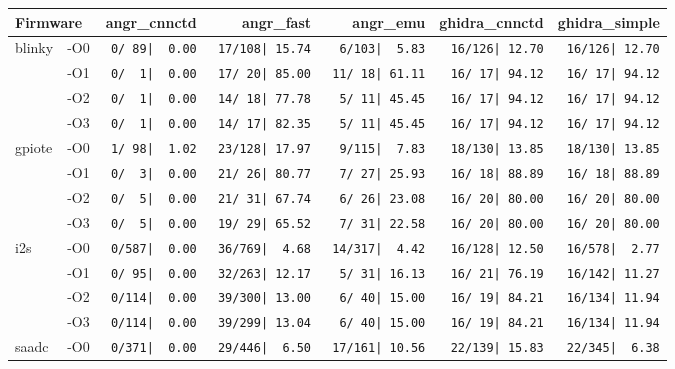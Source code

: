 \begin{tabular}{@{}llrrrrr@{}}
\toprule
\multicolumn{2}{l}{\textbf{Firmware}} & angr\_cnnctd & angr\_fast & angr\_emu & ghidra\_cnnctd & ghidra\_simple \\ \midrule
\multirow{4}{*}{blinky}
    & -O0 & \texttt{  0/~89|~~0.00} & \texttt{ 17/108|~15.74} & \texttt{  6/103|~~5.83} & \texttt{ 16/126|~12.70} & \texttt{ 16/126|~12.70} \\
    & -O1 & \texttt{  0/~~1|~~0.00} & \texttt{ 17/~20|~85.00} & \texttt{ 11/~18|~61.11} & \texttt{ 16/~17|~94.12} & \texttt{ 16/~17|~94.12} \\
    & -O2 & \texttt{  0/~~1|~~0.00} & \texttt{ 14/~18|~77.78} & \texttt{  5/~11|~45.45} & \texttt{ 16/~17|~94.12} & \texttt{ 16/~17|~94.12} \\
    & -O3 & \texttt{  0/~~1|~~0.00} & \texttt{ 14/~17|~82.35} & \texttt{  5/~11|~45.45} & \texttt{ 16/~17|~94.12} & \texttt{ 16/~17|~94.12} \\ \midrule
\multirow{4}{*}{gpiote}
    & -O0 & \texttt{  1/~98|~~1.02} & \texttt{ 23/128|~17.97} & \texttt{  9/115|~~7.83} & \texttt{ 18/130|~13.85} & \texttt{ 18/130|~13.85} \\
    & -O1 & \texttt{  0/~~3|~~0.00} & \texttt{ 21/~26|~80.77} & \texttt{  7/~27|~25.93} & \texttt{ 16/~18|~88.89} & \texttt{ 16/~18|~88.89} \\
    & -O2 & \texttt{  0/~~5|~~0.00} & \texttt{ 21/~31|~67.74} & \texttt{  6/~26|~23.08} & \texttt{ 16/~20|~80.00} & \texttt{ 16/~20|~80.00} \\
    & -O3 & \texttt{  0/~~5|~~0.00} & \texttt{ 19/~29|~65.52} & \texttt{  7/~31|~22.58} & \texttt{ 16/~20|~80.00} & \texttt{ 16/~20|~80.00} \\ \midrule
\multirow{4}{*}{i2s}
    & -O0 & \texttt{  0/587|~~0.00} & \texttt{ 36/769|~~4.68} & \texttt{ 14/317|~~4.42} & \texttt{ 16/128|~12.50} & \texttt{ 16/578|~~2.77} \\
    & -O1 & \texttt{  0/~95|~~0.00} & \texttt{ 32/263|~12.17} & \texttt{  5/~31|~16.13} & \texttt{ 16/~21|~76.19} & \texttt{ 16/142|~11.27} \\
    & -O2 & \texttt{  0/114|~~0.00} & \texttt{ 39/300|~13.00} & \texttt{  6/~40|~15.00} & \texttt{ 16/~19|~84.21} & \texttt{ 16/134|~11.94} \\
    & -O3 & \texttt{  0/114|~~0.00} & \texttt{ 39/299|~13.04} & \texttt{  6/~40|~15.00} & \texttt{ 16/~19|~84.21} & \texttt{ 16/134|~11.94} \\ \midrule
\multirow{4}{*}{saadc}
    & -O0 & \texttt{  0/371|~~0.00} & \texttt{ 29/446|~~6.50} & \texttt{ 17/161|~10.56} & \texttt{ 22/139|~15.83} & \texttt{ 22/345|~~6.38} \\

\end{tabular}
